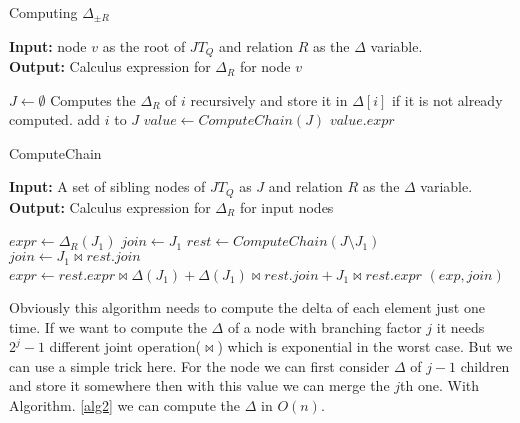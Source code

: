 \documentclass[12pt]{article}
\begin{document}
\begin{algorithm}[H]
\caption{Computing $\Delta_{\pm R}$} 
\label{alg1}
\textbf{Input:} node $v$ as the root of $JT_{Q}$ and relation $R$ as the $\Delta$ variable.\\
\textbf{Output:} Calculus expression for $\Delta_{R}$ for node $v$
\begin{algorithmic}[1]
\STATE $J\gets \emptyset$
\STATE Computes the $\Delta_{R}$ of $i$ recursively and store it in $\Delta[i]$ if it is not already computed.
\STATE add $i$ to $J$
\ENDIF
\ENDFOR
\STATE $value\gets ComputeChain(J)$
\RETURN $value.expr$
\end{algorithmic}
\end{algorithm}

\begin{algorithm}[H]
\caption{ComputeChain} 
\label{alg2}
\textbf{Input:} A set of sibling nodes of $JT_{Q}$ as $J$ and relation $R$ as the $\Delta$ variable.\\
\textbf{Output:} Calculus expression for $\Delta_{R}$ for input nodes\\
\begin{algorithmic}[1]
\STATE $expr\gets \Delta_{R}(J_{1})$ 
\STATE $join\gets J_{1}$
\ELSE
\STATE $rest\gets ComputeChain(J\setminus J_{1})$
\STATE $join\gets J_{1}\bowtie rest.join$
\STATE $expr\gets rest.expr\bowtie \Delta(J_{1})+\Delta(J_{1})\bowtie rest.join+J_{1}\bowtie rest.expr$
\ENDIF
\RETURN $(exp,join)$
\end{algorithmic}
\end{algorithm}

Obviously this algorithm needs to compute the delta of each element just one time. If we want to compute the $\Delta$ of a node with branching factor $j$ it needs $2^{j}-1$ different joint operation($\bowtie$) which is exponential in the worst case. But we can use a simple trick here. For the node we can first consider $\Delta$ of $j-1$ children and store it somewhere then with this value we can merge the $j$th one. With Algorithm. \ref{alg2} we can compute the $\Delta$ in $O(n)$.
\end{document}

